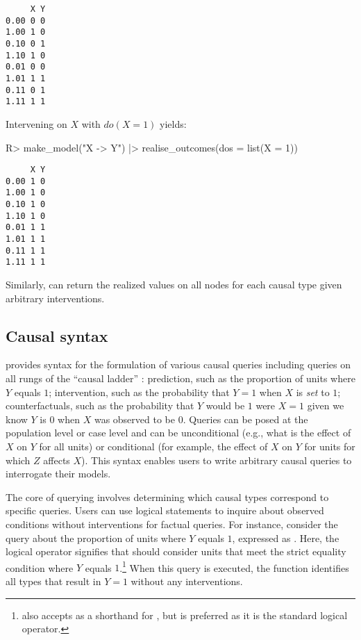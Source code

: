 \documentclass[
  11pt,
  article]{jss}
\renewcommand{\texttt}[1]{\code{#1}}
\begin{document}
\begin{verbatim}
     X Y
0.00 0 0
1.00 1 0
0.10 0 1
1.10 1 0
0.01 0 0
1.01 1 1
0.11 0 1
1.11 1 1
\end{verbatim}

Intervening on \(X\) \citep[see][]{pearl_causality_2009} with
\(do(X=1)\) yields:

\begin{CodeInput}
R> make_model("X -> Y") |> realise_outcomes(dos = list(X = 1))
\end{CodeInput}

\begin{verbatim}
     X Y
0.00 1 0
1.00 1 0
0.10 1 0
1.10 1 0
0.01 1 1
1.01 1 1
0.11 1 1
1.11 1 1
\end{verbatim}

Similarly, \texttt{realise\_outcomes()} can return the realized values
on all nodes for each causal type given arbitrary interventions.

\subsection{Causal syntax}\label{sec-syntax}

 provides syntax for the formulation of various
causal queries including queries on all rungs of the ``causal ladder''
\citep{pearl_causality_2009}: prediction, such as the proportion of
units where \(Y\) equals \(1\); intervention, such as the probability
that \(Y = 1\) when \(X\) is \emph{set} to \(1\); counterfactuals, such
as the probability that \(Y\) would be \(1\) were \(X = 1\) given we
know \(Y\) is \(0\) when \(X\) was observed to be \(0\). Queries can be
posed at the population level or case level and can be unconditional
(e.g., what is the effect of \(X\) on \(Y\) for all units) or
conditional (for example, the effect of \(X\) on \(Y\) for units for
which \(Z\) affects \(X\)). This syntax enables users to write arbitrary
causal queries to interrogate their models.

The core of querying involves determining which causal types correspond
to specific queries. Users can use logical statements to inquire about
observed conditions without interventions for factual queries. For
instance, consider the query about the proportion of units where \(Y\)
equals \(1\), expressed as \texttt{"Y\ ==\ 1"}. Here, the logical
operator \texttt{==} signifies that  should consider
units that meet the strict equality condition where \(Y\) equals
\(1\).\footnote{ also accepts \texttt{=} as a
  shorthand for \texttt{==}, but \texttt{==} is preferred as it is the
  standard logical operator.} When this query is executed, the
\texttt{get\_query\_types()} function identifies all types that result
in \(Y=1\) without any interventions.
\end{document}
